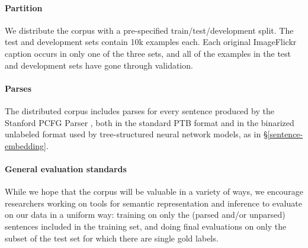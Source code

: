 \paragraph{Partition} We distribute the corpus with a pre-specified train/test/development split. The test and development sets contain 10k examples each. Each original ImageFlickr caption occurs in only one of the three sets, and all of the examples in the test and development sets have gone through validation.


\paragraph{Parses}

The distributed corpus includes parses for every sentence produced by the Stanford PCFG Parser \cite{klein2003accurate}, both in the standard PTB format and in the binarized unlabeled format used by tree-structured neural network models, as in \S\ref{sentence-embedding}.


\paragraph{General evaluation standards}
While we hope that the corpus will be valuable in a variety of ways, we encourage researchers working on tools for semantic representation and inference to evaluate on our data in a uniform way: training on only the (parsed and/or unparsed) sentences included in the training set, and doing final evaluations on only the subset of the test set for which there are single gold labels.
